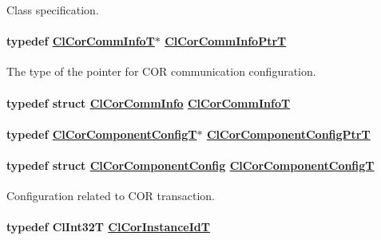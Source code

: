 Class specification. \hypertarget{group__group13_ga24}{
\paragraph[ClCorCommInfoPtrT]{\setlength{\rightskip}{0pt plus 5cm}typedef \hyperlink{struct_cl_cor_comm_info}{Cl\-Cor\-Comm\-Info\-T}$\ast$ \hyperlink{struct_cl_cor_comm_info}{Cl\-Cor\-Comm\-Info\-Ptr\-T}}\hfill}
\label{group__group13_ga24}


The type of the pointer for COR communication configuration. \hypertarget{group__group13_ga23}{
\paragraph[ClCorCommInfoT]{\setlength{\rightskip}{0pt plus 5cm}typedef struct \hyperlink{struct_cl_cor_comm_info}{Cl\-Cor\-Comm\-Info} \hyperlink{struct_cl_cor_comm_info}{Cl\-Cor\-Comm\-Info\-T}}\hfill}
\label{group__group13_ga23}


\hypertarget{group__group13_ga1}{
\paragraph[ClCorComponentConfigPtrT]{\setlength{\rightskip}{0pt plus 5cm}typedef \hyperlink{struct_cl_cor_component_config}{Cl\-Cor\-Component\-Config\-T}$\ast$ \hyperlink{struct_cl_cor_component_config}{Cl\-Cor\-Component\-Config\-Ptr\-T}}\hfill}
\label{group__group13_ga1}


\hypertarget{group__group13_ga0}{
\paragraph[ClCorComponentConfigT]{\setlength{\rightskip}{0pt plus 5cm}typedef struct \hyperlink{struct_cl_cor_component_config}{Cl\-Cor\-Component\-Config}  \hyperlink{struct_cl_cor_component_config}{Cl\-Cor\-Component\-Config\-T}}\hfill}
\label{group__group13_ga0}


Configuration related to COR transaction. \hypertarget{group__group13_ga4}{
\paragraph[ClCorInstanceIdT]{\setlength{\rightskip}{0pt plus 5cm}typedef Cl\-Int32T \hyperlink{group__group13_ga4}{Cl\-Cor\-Instance\-Id\-T}}\hfill}
\label{group__group13_ga4}


